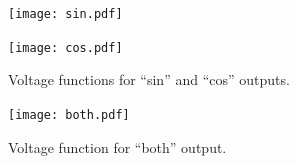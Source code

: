 \begin{figure}
\centering
\texttt{[image: sin.pdf]}\par
\texttt{[image: cos.pdf]}\par
\caption{Voltage functions for ``sin'' and ``cos'' outputs.}\label{fig:shaper-sincos}
\end{figure}

\begin{figure}
\centering
\texttt{[image: both.pdf]}\par
\caption{Voltage function for ``both'' output.}\label{fig:shaper-both}
\end{figure}


